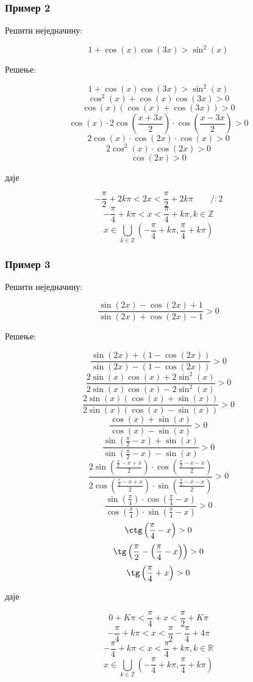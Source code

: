 \documentclass[a4paper,12pt]{article}
\begin{document}
\subsubsection{Пример 2}

Решити неједначину:

\[1+\cos(x)\cos(3x)>\sin^{2}(x)\]

Решење:

\[1+\cos(x)\cos(3x)>\sin^{2}(x)\]
\[\cos^{2}(x)+\cos(x)\cos(3x)>0\]
\[\cos(x)(\cos(x)+\cos(3x))>0\]
\[\cos(x)\cdot2\cos\left(\frac{x+3x}{2}\right)\cdot\cos\left(\frac{x-3x}{2}\right)>0\]
\[2\cos(x)\cdot\cos(2x)\cdot\cos(x)>0\]
\[2\cos^{2}(x)\cdot\cos(2x)>0\]
\[\cos(2x)>0\]
\centerline{даје}
\[-\frac{\pi}{2}+2k\pi<2x<\frac{\pi}{2}+2k\pi\qquad/:2\]
\[-\frac{\pi}{4}+k\pi<x<\frac{\pi}{4}+k\pi,k\in\mathbb{Z}\]
\[x\in\bigcup_{k\in\mathbb{Z}}\left(-\frac{\pi}{4}+k\pi,\frac{\pi}{4}+k\pi\right)\]


\subsubsection{Пример 3}

Решити неједначину:

\[\frac{\sin(2x)-\cos(2x)+1}{\sin(2x)+\cos(2x)-1}>0\]

Решење:

\[\frac{\sin(2x)+(1-\cos(2x))}{\sin(2x)-(1-\cos(2x))}>0\]
\[\frac{2\sin(x)\cos(x)+2\sin^{2}(x)}{2\sin(x)\cos(x)-2\sin^{2}(x)}>0\]
\[\frac{2\sin(x)(\cos(x)+\sin(x))}{2\sin(x)(\cos(x)-\sin(x))}>0\]
\[\frac{\cos(x)+\sin(x)}{\cos(x)-\sin(x)}>0\]
\[\frac{\sin\left(\frac{\pi}{2}-x\right)+\sin(x)}{\sin\left(\frac{\pi}{2}-x\right)-\sin(x)}>0\]
\[\frac{2\sin\left(\frac{\frac{\pi}{2}-x+x}{2}\right)\cdot\cos\left(\frac{\frac{\pi}{2}-x-x}{2}\right)}{2\cos\left(\frac{\frac{\pi}{2}-x+x}{2}\right)\cdot\sin\left(\frac{\frac{\pi}{2}-x-x}{2}\right)}>0\]
\[\frac{\sin\left(\frac{\pi}{4}\right)\cdot\cos\left(\frac{\pi}{4}-x\right)}{\cos\left(\frac{\pi}{4}\right)\cdot\sin\left(\frac{\pi}{4}-x\right)}>0\]
\[\ctg\left(\frac{\pi}{4}-x\right)>0\]
\[\tg\left(\frac{\pi}{2}-\left(\frac{\pi}{4}-x\right)\right)>0\]
\[\tg\left(\frac{\pi}{4}+x\right)>0\]
\centerline{даје}
\[0+K\pi<\frac{\pi}{4}+x<\frac{\pi}{2}+K\pi\]
\[-\frac{\pi}{4}+k\pi<x<\frac{\pi}{2}-\frac{\pi}{4}+4\pi\]
\[-\frac{\pi}{4}+k\pi<x<\frac{\pi}{4}+k\pi,k\in\mathbb{R}\]
\[x\in\bigcup_{k\in\mathbb{Z}}\left(-\frac{\pi}{4}+k\pi,\frac{\pi}{4}+k\pi\right)\]
\end{document}
